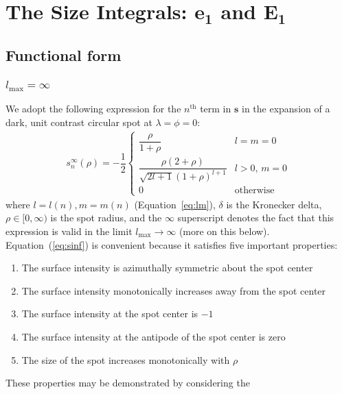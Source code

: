 \documentclass[modern]{aastex62}
\begin{document}
%
\section{The Size Integrals: \lowercase{$\mathbf{e_1}$} and $\mathbf{E_1}$}
\label{sec:size}
%
\subsection{Functional form}
%

\subsubsection{$l_{\mathrm{max}} = \infty$}
\label{sec:size-function}
%
We adopt the following expression for the $n^{\mathrm{th}}$ term in $\mathbf{s}$
in the expansion of a dark, unit contrast circular spot at
$\lambda = \phi = 0$:
%
\begin{align}
    \label{eq:sinf}
    s_{n}^\infty(\rho) =
    -\dfrac{1}{2}
    \begin{cases}
        \dfrac{\rho}{1 + \rho}
         & l = m = 0
        \\[1em]
        \dfrac{\rho \left( 2 + \rho \right)}
        {\sqrt{2l + 1} (1 + \rho)^{l + 1}}
         & l > 0, \, m = 0
        \\[1em]
        0
         & \mathrm{otherwise}
    \end{cases}
\end{align}
%
where
$l = l(n), m = m(n)$ (Equation~\ref{eq:lm}),
$\delta$ is the Kronecker delta,
$\rho \in [0, \infty)$ is the spot radius,
and the $\infty$ superscript denotes the fact that this expression
is valid in the limit $l_{\mathrm{max}} \rightarrow \infty$
(more on this below).
Equation~(\ref{eq:sinf}) is convenient because it satisfies
five important properties:
%
\begin{enumerate}[itemsep=2pt,parsep=1pt,label=\textbf{\arabic*}]
    \item The surface intensity is azimuthally symmetric about the spot center
    \item The surface intensity monotonically increases away from the spot center
    \item The surface intensity at the spot center is $-1$
    \item The surface intensity at the antipode of the spot center is zero
    \item The size of the spot increases monotonically with $\rho$
\end{enumerate}
%
These properties may be demonstrated by considering the
\end{document}
